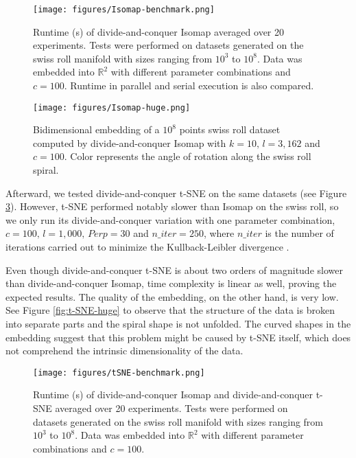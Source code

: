 \begin{figure}
    \centering
    \texttt{[image: figures/Isomap-benchmark.png]}
    \caption{Runtime (s) of divide-and-conquer Isomap averaged over 20 experiments. Tests were performed on datasets generated on the swiss roll manifold with sizes ranging from $10^3$ to $10^8$. Data was embedded into $\mathbb{R}^2$ with different parameter combinations and $c=100$. Runtime in parallel and serial execution is also compared.}
    \label{fig:Isomap-benchmark}
\end{figure}

\begin{figure}
    \centering
    \texttt{[image: figures/Isomap-huge.png]}
    \caption{Bidimensional embedding of a $10^8$ points swiss roll dataset computed by divide-and-conquer Isomap with $k=10, \, l=3,162$ and $c=100$. Color represents the angle of rotation along the swiss roll spiral.}
    \label{fig:Isomap-huge}
\end{figure}

Afterward, we tested divide-and-conquer t-SNE on the same datasets (see Figure \ref{fig:t-SNE-benchmark}). However, t-SNE performed notably slower than Isomap on the swiss roll, so we only run its divide-and-conquer variation with one parameter combination, $c = 100, \, l=1,000, \, Perp=30$ and $n\_iter=250$, where $n\_iter$ is the number of iterations carried out to minimize the Kullback-Leibler divergence \citep{Kullback1951}.

Even though divide-and-conquer t-SNE is about two orders of magnitude slower than divide-and-conquer Isomap, time complexity is linear as well, proving the expected results. The quality of the embedding, on the other hand, is very low. See Figure \ref{fig:t-SNE-huge} to observe that the structure of the data is broken into separate parts and the spiral shape is not unfolded. The curved shapes in the embedding suggest that this problem might be caused by t-SNE itself, which does not comprehend the intrinsic dimensionality of the data.

\begin{figure}
    \centering
    \texttt{[image: figures/tSNE-benchmark.png]}
    \caption{Runtime (s) of divide-and-conquer Isomap and divide-and-conquer t-SNE averaged over 20 experiments. Tests were performed on datasets generated on the swiss roll manifold with sizes ranging from $10^3$ to $10^8$. Data was embedded into $\mathbb{R}^2$ with different parameter combinations and $c=100$.}
    \label{fig:t-SNE-benchmark}
\end{figure}

